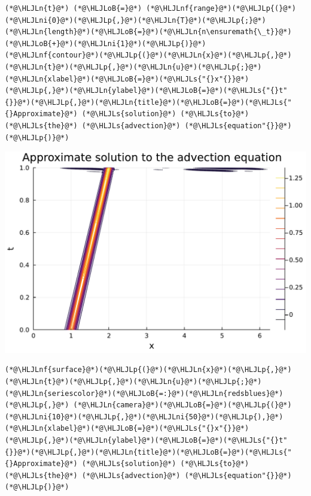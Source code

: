 \documentclass[12pt,landscape]{article}
\newcommand{\HLJLn}[1]{#1}
\newcommand{\HLJLnf}[1]{\textcolor[RGB]{66,102,213}{#1}}
\newcommand{\HLJLs}[1]{\textcolor[RGB]{201,61,57}{#1}}
\newcommand{\HLJLni}[1]{\textcolor[RGB]{59,151,46}{#1}}
\newcommand{\HLJLoB}[1]{\textcolor[RGB]{102,102,102}{\textbf{#1}}}
\newcommand{\HLJLp}[1]{#1}
\begin{document}
{\begin{lstlisting}
(*@\HLJLn{t}@*) (*@\HLJLoB{=}@*) (*@\HLJLnf{range}@*)(*@\HLJLp{(}@*)(*@\HLJLni{0}@*)(*@\HLJLp{,}@*)(*@\HLJLn{T}@*)(*@\HLJLp{;}@*)(*@\HLJLn{length}@*)(*@\HLJLoB{=}@*)(*@\HLJLn{n\ensuremath{\_t}}@*)(*@\HLJLoB{+}@*)(*@\HLJLni{1}@*)(*@\HLJLp{)}@*)
(*@\HLJLnf{contour}@*)(*@\HLJLp{(}@*)(*@\HLJLn{x}@*)(*@\HLJLp{,}@*)(*@\HLJLn{t}@*)(*@\HLJLp{,}@*)(*@\HLJLn{u}@*)(*@\HLJLp{;}@*)(*@\HLJLn{xlabel}@*)(*@\HLJLoB{=}@*)(*@\HLJLs{"{}x"{}}@*)(*@\HLJLp{,}@*)(*@\HLJLn{ylabel}@*)(*@\HLJLoB{=}@*)(*@\HLJLs{"{}t"{}}@*)(*@\HLJLp{,}@*)(*@\HLJLn{title}@*)(*@\HLJLoB{=}@*)(*@\HLJLs{"{}Approximate}@*) (*@\HLJLs{solution}@*) (*@\HLJLs{to}@*) (*@\HLJLs{the}@*) (*@\HLJLs{advection}@*) (*@\HLJLs{equation"{}}@*)(*@\HLJLp{)}@*)
\end{lstlisting}

\includegraphics[width=\linewidth]{jl_qsW2Qg/Fourier_14_1.pdf}

\begin{lstlisting}
(*@\HLJLnf{surface}@*)(*@\HLJLp{(}@*)(*@\HLJLn{x}@*)(*@\HLJLp{,}@*)(*@\HLJLn{t}@*)(*@\HLJLp{,}@*)(*@\HLJLn{u}@*)(*@\HLJLp{;}@*)(*@\HLJLn{seriescolor}@*)(*@\HLJLoB{=:}@*)(*@\HLJLn{redsblues}@*)(*@\HLJLp{,}@*) (*@\HLJLn{camera}@*)(*@\HLJLoB{=}@*)(*@\HLJLp{(}@*)(*@\HLJLni{10}@*)(*@\HLJLp{,}@*)(*@\HLJLni{50}@*)(*@\HLJLp{),}@*)
(*@\HLJLn{xlabel}@*)(*@\HLJLoB{=}@*)(*@\HLJLs{"{}x"{}}@*)(*@\HLJLp{,}@*)(*@\HLJLn{ylabel}@*)(*@\HLJLoB{=}@*)(*@\HLJLs{"{}t"{}}@*)(*@\HLJLp{,}@*)(*@\HLJLn{title}@*)(*@\HLJLoB{=}@*)(*@\HLJLs{"{}Approximate}@*) (*@\HLJLs{solution}@*) (*@\HLJLs{to}@*) (*@\HLJLs{the}@*) (*@\HLJLs{advection}@*) (*@\HLJLs{equation"{}}@*)(*@\HLJLp{)}@*)
\end{lstlisting}

}
\end{document}
